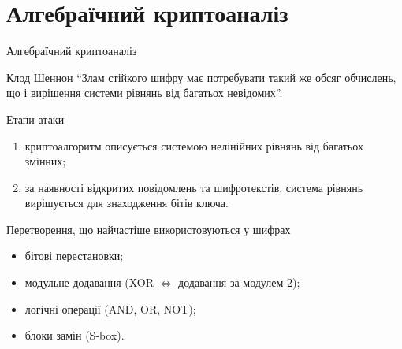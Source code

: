 \documentclass[10pt, ucs]{beamer}
\begin{document}
\section{Алгебраїчний криптоаналіз}
\begin{frame}{Алгебраїчний криптоаналіз}
    \begin{block}{Клод Шеннон}
        ``Злам стійкого шифру має потребувати такий же обсяг обчислень, що і
        вирішення системи рівнянь від багатьох невідомих''.
    \end{block}

    \begin{block}{Етапи атаки}
        \begin{enumerate}
            \item криптоалгоритм описується системою нелінійних рівнянь 
                від багатьох змінних;
            \item за наявності відкритих повідомлень та шифротекстів,
                система рівнянь вирішується для знаходження бітів ключа.
        \end{enumerate}
    \end{block}

    \begin{block}{Перетворення, що найчастіше використовуються у шифрах}
        \begin{itemize}
            \item бітові перестановки;
            \item модульне додавання (XOR $\Leftrightarrow$ додавання за
                модулем 2);
            \item логічні операції (AND, OR, NOT);
            \item блоки замін (S-box).
        \end{itemize}
    \end{block}
\end{frame}
\end{document}
